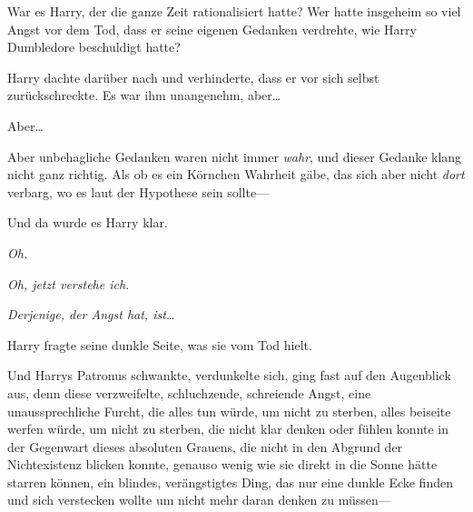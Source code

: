 War es Harry, der die ganze Zeit rationalisiert hatte? Wer hatte insgeheim so viel Angst vor dem Tod, dass er seine eigenen Gedanken verdrehte, wie Harry Dumbledore beschuldigt hatte?

Harry dachte darüber nach und verhinderte, dass er vor sich selbst zurückschreckte. Es war ihm unangenehm, aber…

Aber…

Aber unbehagliche Gedanken waren nicht immer \emph{wahr}, und dieser Gedanke klang nicht ganz richtig. Als ob es ein Körnchen Wahrheit gäbe, das sich aber nicht \emph{dort} verbarg, wo es laut der Hypothese sein sollte—

Und da wurde es Harry klar.

\emph{Oh.}

\emph{Oh, jetzt verstehe ich.}

\emph{Derjenige, der Angst hat, ist…}

Harry fragte seine dunkle Seite, was sie vom Tod hielt.

Und Harrys Patronus schwankte, verdunkelte sich, ging fast auf den Augenblick aus, denn diese verzweifelte, schluchzende, schreiende Angst, eine unaussprechliche Furcht, die alles tun würde, um nicht zu sterben, alles beiseite werfen würde, um nicht zu sterben, die nicht klar denken oder fühlen konnte in der Gegenwart dieses absoluten Grauens, die nicht in den Abgrund der Nichtexistenz blicken konnte, genauso wenig wie sie direkt in die Sonne hätte starren können, ein blindes, verängstigtes Ding, das nur eine dunkle Ecke finden und sich verstecken wollte um nicht mehr daran denken zu müssen—

